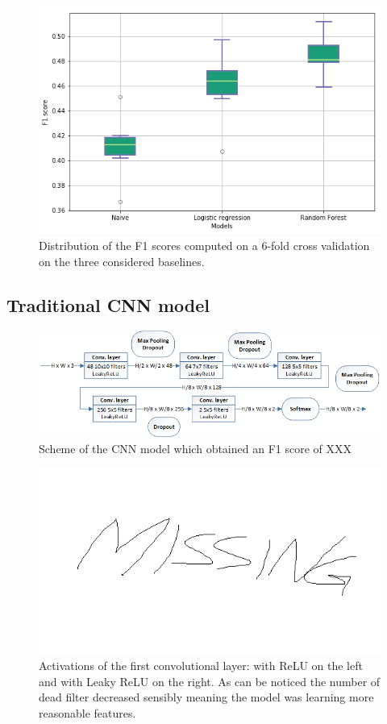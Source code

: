 \documentclass[10pt,conference,compsocconf]{IEEEtran}
\begin{document}
\begin{figure}[tbp]
	\centering
	\includegraphics[width=0.8\columnwidth]{img/boxplots_naive.png}
	\caption{Distribution of the F1 scores computed on a 6-fold cross validation on the three considered baselines.}
	\vspace{-3mm}
	\label{fig:baselines}
\end{figure}

\subsection{Traditional CNN model}
\begin{figure}[tbp]
	\centering
	\includegraphics[width=\columnwidth]{img/cnnModel.png}
	\caption{Scheme of the CNN model which obtained an F1 score of XXX }
	\vspace{-3mm}
	\label{fig:cnn-model}
\end{figure}
\begin{figure}[tbp]
	\centering
	\includegraphics[width=0.8\columnwidth]{img/missing.png}
	\caption{Activations of the first convolutional layer: with ReLU on the left and with Leaky ReLU on the right. As can be noticed the number of dead filter decreased sensibly meaning the model was learning more reasonable features.}
	\vspace{-3mm}
	\label{fig:dead-filters}
\end{figure}
\end{document}
